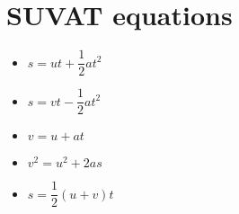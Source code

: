 \section{SUVAT equations}
\begin{itemize}
	\item $s=ut+\dfrac{1}{2}at^2$
	\item $s=vt-\dfrac{1}{2}at^2$
	\item $v=u+at$
	\item $v^2=u^2+2as$
	\item $s=\dfrac{1}{2}(u+v)t$
\end{itemize}
